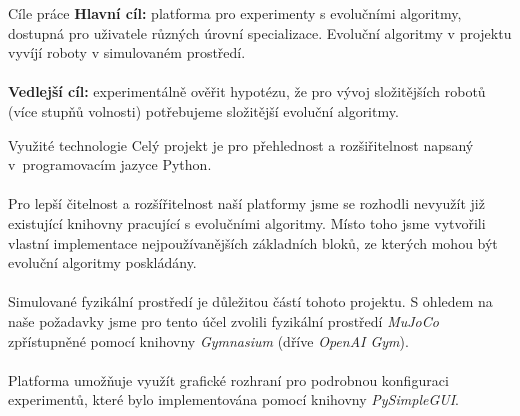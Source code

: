 \documentclass[portrait,a0paper,fontscale=0.25]{baposter}
\begin{document}
\begin{poster}
\begin{posterbox}[column=0, name=goals, below=uvod, headerColorOne=cyan!60, boxColorOne=cyan!20]{Cíle práce}
\textbf{Hlavní cíl:} platforma pro experimenty s evolučními algoritmy, dostupná
pro uživatele různých úrovní specializace. Evoluční algoritmy v projektu
vyvíjí roboty v simulovaném prostředí.
\\\\
\textbf{Vedlejší cíl:} experimentálně ověřit hypotézu, že pro
vývoj složitějších robotů (více stupňů volnosti) potřebujeme složitější
evoluční algoritmy.
\end{posterbox}

\begin{posterbox}[column=0, name=something1, below=goals]{Využité technologie}
Celý projekt je pro přehlednost a rozšiřitelnost napsaný v~programovacím jazyce
Python.
\\\\
Pro lepší čitelnost a rozšířitelnost naší platformy jsme se rozhodli nevyužít
již existující knihovny pracující s evolučními algoritmy. Místo toho jsme
vytvořili vlastní implementace nejpoužívanějších základních bloků, ze kterých
mohou být evoluční algoritmy poskládány.
\\\\
Simulované fyzikální prostředí je důležitou částí tohoto projektu. S ohledem na
naše požadavky jsme pro tento účel zvolili fyzikální prostředí \emph{MuJoCo}
zpřístupněné pomocí knihovny \emph{Gymnasium} (dříve \emph{OpenAI Gym}).
\\\\
Platforma umožňuje využít grafické rozhraní pro podrobnou konfiguraci
experimentů, které bylo implementována pomocí knihovny \emph{PySimpleGUI}.


\end{posterbox}
\end{poster}
\end{document}
